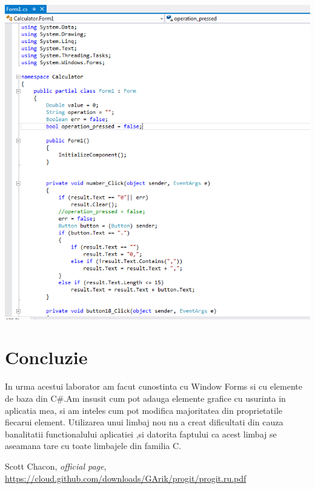 \documentclass[a4paper, 12pt]{article}
\begin{document}
\includegraphics*{logic_gen}

\newpage
\section{Concluzie}
In urma acestui laborator am facut cunostinta cu Window Forms si cu elemente de baza din C#.Am insusit cum pot adauga elemente grafice cu usurinta in aplicatia mea, si am inteles cum pot modifica majoritatea din proprietatile fiecarui element.
Utilizarea unui limbaj nou nu a creat dificultati din cauza banalitatii functionalului aplicatiei ,si datorita faptului ca acest limbaj se aseamana tare cu toate limbajele din familia C.
\clearpage

\begin{thebibliography}{1}


 Scott Chacon, \textit{ official page}, \url{https://cloud.github.com/downloads/GArik/progit/progit.ru.pdf}



\end{thebibliography}
\end{document}
